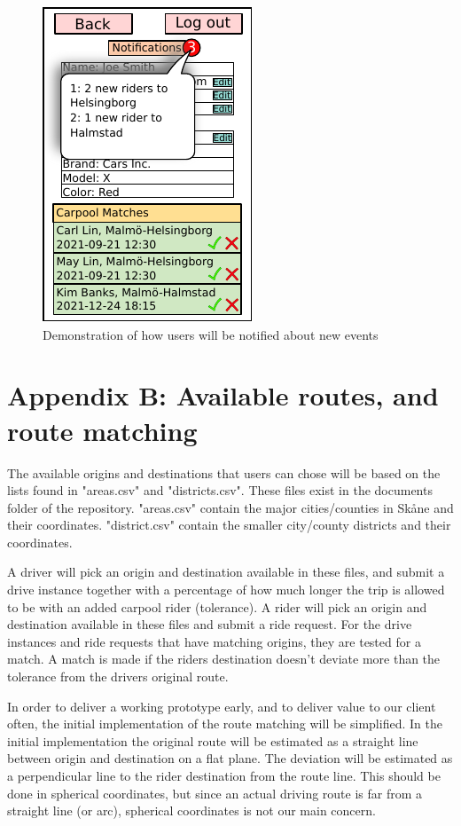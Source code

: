 \documentclass{article}
\begin{document}
\begin{figure}[!htpb]
\begin{minipage}{0.25\textwidth}
        \centering
        \includegraphics[scale=1]{profile3.pdf}
        \caption{Demonstration of how users will be notified about new events}
        \label{fig:profile3}
    \end{minipage}\hfill
\end{figure}

\newpage
\section{Appendix B: Available routes, and route matching}
The available origins and destinations that users can chose will be based on the lists found in "areas.csv" and "districts.csv". These files exist in the documents folder of the repository. "areas.csv" contain the major cities/counties in Skåne and their coordinates. "district.csv" contain the smaller city/county districts and their coordinates.

A driver will pick an origin and destination available in these files, and submit a drive instance together with a percentage of how much longer the trip is allowed to be with an added carpool rider (tolerance). A rider will pick an origin and destination available in these files and submit a ride request. For the drive instances and ride requests that have matching origins, they are tested for a match. A match is made if the riders destination doesn't deviate more than the tolerance from the drivers original route.

In order to deliver a working prototype early, and to deliver value to our client often, the initial implementation of the route matching will be simplified. In the initial implementation the original route will be estimated as a straight line between origin and destination on a flat plane. The deviation will be estimated as a perpendicular line to the rider destination from the route line. This should be done in spherical coordinates, but since an actual driving route is far from a straight line (or arc), spherical coordinates is not our main concern.
\end{document}
